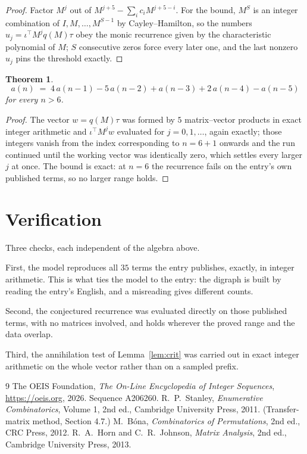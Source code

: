 \documentclass[11pt,a4paper]{article}
\theoremstyle{plain}
\newtheorem{theorem}{Theorem}
\theoremstyle{definition}
\begin{document}
\begin{proof}
Factor $M^{j}$ out of $M^{j+5}-\sum_ic_iM^{j+5-i}$. For the bound, $M^{S}$
is an integer combination of $I,M,\dots,M^{S-1}$ by Cayley--Hamilton, so the numbers
$u_j=\iota^{\!\top}M^{j}q(M)\tau$ obey the monic recurrence given by the characteristic
polynomial of $M$; $S$ consecutive zeros force every later one, and the last nonzero $u_j$
pins the threshold exactly.
\end{proof}

\begin{theorem}
\[
a(n)\;=\;4\,a(n-1) - 5\,a(n-2) + a(n-3) + 2\,a(n-4) - a(n-5)
\]
for every $n>6$.
\end{theorem}

\begin{proof}
The vector $w=q(M)\tau$ was formed by $5$ matrix--vector products in exact integer
arithmetic and $\iota^{\!\top}M^{j}w$ evaluated for $j=0,1,\dots$, again exactly; those
integers vanish from the index corresponding to $n=6+1$ onwards and the run continued
until the working vector was identically zero, which settles every larger $j$ at once. The bound is exact: at $n=6$ the recurrence fails on the entry's own published terms, so no larger range holds.
\end{proof}

\section{Verification}

Three checks, each independent of the algebra above.

First, the model reproduces all $35$ terms the entry publishes, exactly, in integer
arithmetic. This is what ties the model to the entry: the digraph is built by reading the
entry's English, and a misreading gives different counts.

Second, the conjectured recurrence was evaluated directly on those published terms, with no
matrices involved, and holds wherever the proved range and the data overlap.

Third, the annihilation test of Lemma~\ref{lem:crit} was carried out in exact integer
arithmetic on the whole vector rather than on a sampled prefix.

\begin{thebibliography}{9}
 The OEIS Foundation, \emph{The On-Line Encyclopedia of Integer
Sequences}, \url{https://oeis.org}, 2026. Sequence A206260.
 R.~P.~Stanley, \emph{Enumerative Combinatorics}, Volume 1, 2nd ed.,
Cambridge University Press, 2011. (Transfer-matrix method, Section 4.7.)
 M.~B\'ona, \emph{Combinatorics of Permutations}, 2nd ed., CRC
Press, 2012.
 R.~A.~Horn and C.~R.~Johnson, \emph{Matrix Analysis}, 2nd ed., Cambridge
University Press, 2013.
\end{thebibliography}
\end{document}
